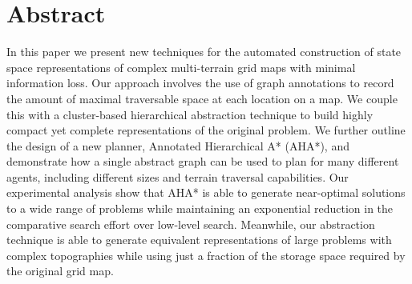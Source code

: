 \section{Abstract}
In this paper we present new techniques for the automated construction of state space representations of complex multi-terrain grid maps with minimal information loss. Our approach involves the use of graph annotations to record the amount of maximal traversable space at each location on a map. We couple this with a cluster-based hierarchical abstraction technique to build highly compact yet complete representations of the original problem. We further outline the design of a new planner, Annotated Hierarchical A* (AHA*), and demonstrate how a single abstract graph can be used to plan for many different agents, including different sizes and terrain traversal capabilities. 
Our experimental analysis show that AHA* is able to generate near-optimal solutions to a wide range of problems while maintaining an exponential reduction in the comparative search effort over low-level search. Meanwhile, our abstraction technique is able to generate equivalent representations of large problems with complex topographies while using just a fraction of the storage space required by the original grid map.

